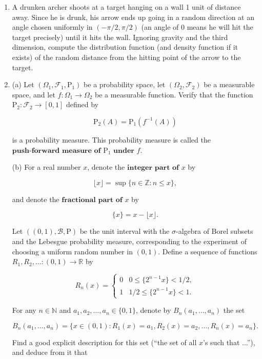 \documentclass[11pt]{report}
\providecommand{\cal}{\mathcal}
\newcommand{\R}{\mathbb{R}}
\newcommand{\Z}{\mathbb{Z}}
\theoremstyle{plain}
\theoremstyle{definition}
\begin{document}
\begin{enumerate}[label=\arabic*.]
\item A drunken archer shoots at a target hanging on a wall
1 unit of distance away. Since he is drunk, his arrow
ends up going in a random direction at an angle chosen
uniformly in $(-\pi/2,\pi/2)$ (an angle of $0$ means
he will hit the target precisely) until it hits the
wall. Ignoring gravity and the third dimension,
compute the distribution function (and density
function if it exists) of the random distance from the
hitting point of the arrow to the target.

\item (a) Let $(\Omega_1, {\cal F}_1, \mathrm{P}_1)$ be a
probability space, let $(\Omega_2, {\cal F}_2)$ be a
measurable space, and let $f:\Omega_1\to\Omega_2$ be
a measurable function. Verify that the function
$\mathrm{P}_2:{\cal F}_2\to [0,1]$ defined by

\[
\mathrm{P}_2(A) = \mathrm{P}_1(f^{-1}(A))
\]

\noindent is a probability measure. This probability measure is
called the
$\textbf{push-forward measure of } \mathrm{P}_1
\textbf{ under } f$.

(b) For a real number $x$, denote the
$\textbf{integer part of } x$ by

\[
\lfloor x \rfloor = \sup \{ n \in \Z : n \le x \},
\]

\noindent and denote the $\textbf{fractional part of } x$ by

\[
\{ x \} = x - \lfloor x \rfloor.
\]

\noindent Let $((0,1), {\cal B}, \mathrm{P})$ be the unit
interval with the $\sigma$-algebra of Borel subsets
and the Lebesgue probability measure, corresponding to
the experiment of choosing a uniform random number in
$(0,1)$. Define a sequence of functions
$R_1, R_2, \ldots : (0,1) \to \R$ by

\[
R_n(x) = \begin{cases} 0 & 0 \le \{ 2^{n-1} x \} < 1/2, \\ 1 &
1/2 \le \{ 2^{n-1} x \} < 1. \end{cases}
\]

\noindent For any $n\in \mathbb{N}$ and
$a_1, a_2, \ldots, a_n \in \{0,1\}$, denote by
$B_n(a_1,\ldots,a_n)$ the set

\[
B_n(a_1,\ldots,a_n) = \{ x \in (0,1) : R_1(x)=a_1, R_2(x)=a_2, \ldots, R_n(x) = a_n \}.
\]

\noindent Find a good explicit description for this set (``the
set of all $x$'s such that ...''), and deduce from it
that


\end{enumerate}
\end{document}
